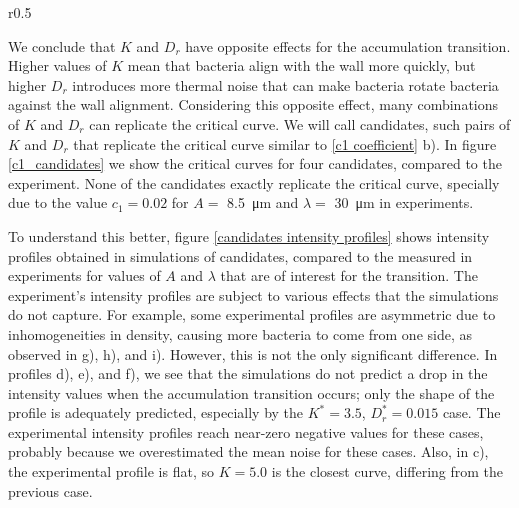 \begin{wrapfigure}{r}{0.5\linewidth}
\centering

\caption[Comparison of the accumulation transition curves for different values of $K$ and $D_r$]{Critical curves for different candidates compared to the experimental critical curve. The $c_1$ values correspond to the experimental values. We observe a parabolic shape for the critical curve. }
\label{c1_candidates}
\end{wrapfigure}


We conclude that $K$ and $D_r$ have opposite effects for the accumulation transition. Higher values of $K$ mean that bacteria align with the wall more quickly, but higher $D_r$ introduces more thermal noise that can make bacteria rotate bacteria against the wall alignment. Considering this opposite effect, many combinations of $K$ and $D_r$ can replicate the critical curve. We will call candidates, such pairs of $K$ and $D_r$ that replicate the critical curve similar to \ref{c1 coefficient} b). In figure \ref{c1_candidates} we show the critical curves for four candidates, compared to the experiment. None of the candidates exactly replicate the critical curve, specially due to the value $c_1=0.02$ for $A=$ \SI{8.5}{\micro\meter} and $\lambda= $ \SI{30}{\micro\meter} in experiments.

To understand this better, figure \ref{candidates intensity profiles} shows intensity profiles obtained in simulations of candidates, compared to the measured in experiments for values of $A$ and $\lambda$ that are of interest for the transition. The experiment's intensity profiles are subject to various effects that the simulations do not capture. For example, some experimental profiles are asymmetric due to inhomogeneities in density, causing more bacteria to come from one side, as observed in g), h), and i). However, this is not the only significant difference. In profiles d), e), and f), we see that the simulations do not predict a drop in the intensity values when the accumulation transition occurs; only the shape of the profile is adequately predicted, especially by the $K^*=3.5$, $D_r^*=0.015$ case. The experimental intensity profiles reach near-zero negative values for these cases, probably because we overestimated the mean noise for these cases. Also, in c), the experimental profile is flat, so $K=5.0$ is the closest curve, differing from the previous case.

